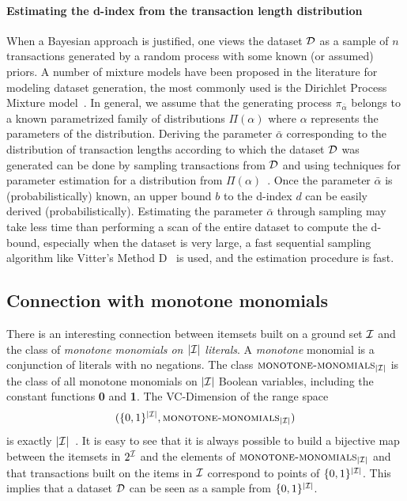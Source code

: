 \paragraph{Estimating the d-index from the transaction length distribution} When
a Bayesian approach is justified, one views the dataset ${\cal D}$ as a sample of $n$
transactions generated by a random process with some known (or assumed) priors.
A number of mixture models have been proposed in the literature for modeling
dataset generation, the most commonly used is the Dirichlet Process Mixture
model~\citep{HeS12}.
In general, we assume that the generating process 
$\pi_{\bar{\alpha}}$ belongs to a known parametrized family of distributions
$\Pi(\alpha)$ where $\alpha$ represents the parameters of the distribution.
Deriving the parameter $\bar\alpha$ corresponding to the distribution of
transaction lengths according to which the dataset ${\cal D}$ was generated can be
done by sampling transactions from ${\cal D}$ and using techniques for parameter
estimation for a distribution from $\Pi(\alpha)$~\citep{LehmannC98,HastieTF09}.
Once the parameter $\bar\alpha$ is (probabilistically) known, an upper bound $b$
to the d-index $d$ can be easily derived (probabilistically).  
Estimating the parameter $\bar\alpha$ through sampling may take less time than
performing a scan of the entire dataset to compute the d-bound, especially when
the dataset is very large, a fast sequential sampling algorithm like Vitter's
Method D~\citep{Vitter87} is used, and the estimation procedure is fast.

\subsection{Connection with monotone monomials}\label{sec:vcminemonomials}
There is an interesting connection between itemsets built on a ground set
${\cal I}$ and 
the class of \emph{monotone monomials on $|{\cal I}|$ literals}. 
A \emph{monotone} monomial is a conjunction of literals with no negations. The
class $\textsc{monotone-monomials}_{|{\cal I}|}$ is the class of
all monotone monomials on $|{\cal I}|$ Boolean variables, including the constant functions
{\bf 0} and {\bf 1}. The VC-Dimension of the range space
\[
(\{0,1\}^{|{\cal I}|},\textsc{monotone-monomials}_{|{\cal I}|})\]
is exactly $|{\cal I}|$~\cite[Coroll.~3]{NatschlagerS96}. It is easy to see that it is always
possible to build a bijective map between the itemsets in $2^{\cal I}$ and the
elements of $\textsc{monotone-monomials}_{|{\cal I}|}$ and that transactions built
on the items in ${\cal I}$ correspond to points of $\{0,1\}^{|{\cal I}|}$. This implies
that a dataset ${\cal D}$ can be seen as a sample from $\{0,1\}^{|{\cal I}|}$.

